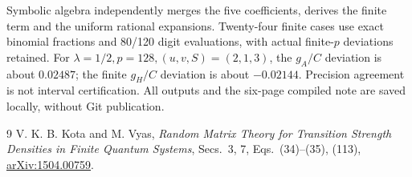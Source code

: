 \documentclass[11pt,a4paper]{article}
\begin{document}
Symbolic algebra independently merges the five coefficients,
derives the finite term and the uniform rational expansions.
Twenty-four finite cases use exact binomial fractions and 80/120
digit evaluations, with actual finite-$p$ deviations retained. For
$\lambda=1/2,p=128,(u,v,S)=(2,1,3)$, the $g_A/C$ deviation is about
$0.02487$; the finite $g_H/C$ deviation is about $-0.02144$.
Precision agreement is not interval certification. All outputs and
the six-page compiled note are saved locally, without Git publication.

\begin{thebibliography}{9}
 V. K. B. Kota and M. Vyas,
\emph{Random Matrix Theory for Transition Strength Densities in Finite
Quantum Systems}, Secs.~3, 7, Eqs.~(34)--(35), (113),
\href{https://arxiv.org/abs/1504.00759}{arXiv:1504.00759}.
\end{thebibliography}
\end{document}

